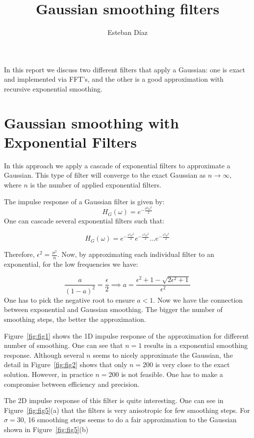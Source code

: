 \documentclass[10pt]{article}
\author{Esteban D\'{i}az}
\title{Gaussian smoothing filters}{}
\begin{document}
\maketitle

In this report we discuss two different filters that
apply a Gaussian: one is exact and implemented via FFT's, and
the other is a good approximation with recursive exponential smoothing.

\section{Gaussian smoothing with Exponential Filters}
In this approach we apply a cascade of exponential filters to 
approximate a Gaussian. This type of filter will converge 
to the exact Gaussian as $n \rightarrow \infty$, where $n$ is 
the number of applied exponential filters.

The impulse response of a Gaussian filter is given by:
\begin{equation}
  H_G(\omega) = e^{-\frac{\sigma^2\omega^2}{2}}
\end{equation}
One can cascade several exponential filters such that:

\[
H_G(\omega) = e^{-\frac{\epsilon^2\omega^2}{2}} e^{-\frac{\epsilon^2\omega^2}{2}}\dots e^{-\frac{\epsilon^2\omega^2}{2}}
\]

Therefore, $\epsilon^2 = \frac{\sigma^2}{n}$. Now, by approximating each individual
filter to an exponential, for the low frequencies we have:

\[
\frac{a}{(1-a)^2}=\frac{\epsilon}{2} \implies a =\frac{\epsilon^2 +1 -\sqrt{2\epsilon^2+1}}{\epsilon^2}
\]
One has to pick the negative root to ensure $a<1$. Now we have the connection between 
exponential and Gaussian smoothing. The bigger the number of smoothing steps, the better
the approximation.

Figure~\ref{fig:fig1} shows the 1D impulse response of the approximation for different number
 of smoothing. One can see that $n=1$ results in a exponential smoothing response.
Although several $n$ seems to nicely approximate the Gaussian, the detail in Figure~\ref{fig:fig2}
shows that only $n=200$ is very close to the exact solution. However, in practice $n=200$ is not
feasible. One has to make a compromise between efficiency and precision.


The 2D impulse response of this filter is quite interesting. One can see in Figure~\ref{fig:fig5}(a)
that the filters is very anisotropic for few smoothing steps. For $\sigma=30$, 16 smoothing steps 
seems to do a fair approximation to the Gaussian shown in Figure~\ref{fig:fig5}(b) 
\end{document}
